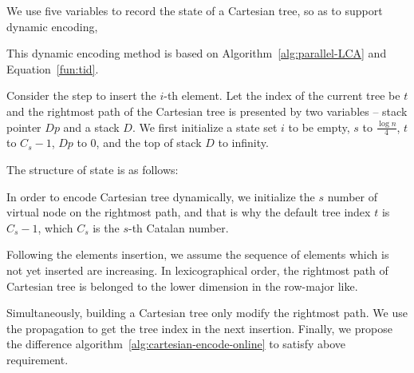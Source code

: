 



We use five variables to record the state of a Cartesian tree, so as
to support dynamic encoding,

This dynamic encoding method is based on
Algorithm~\ref{alg:parallel-LCA} and Equation~\ref{fun:tid}.

Consider the step to insert the $i$-th element.  Let the index of the
current tree be $t$ and the rightmost path of the Cartesian tree is
presented by two variables -- stack pointer $Dp$ and a stack $D$.  We
first initialize a state set $i$ to be empty, $s$ to $\frac{\log
  n}{4}$, ${t}$ to $C_s - 1$, $Dp$ to 0, and the top of stack $D$ to
infinity.

The structure of state is as follows:

\iffalse
我們定義轉移狀態由 5 個變數來決定動態笛卡爾樹的編碼，當前插入第 $i$ 個
元素，最終填充 $s$ 個元素，當前的樹編號 $\mathit{tid}$，以及笛卡爾樹的
右鏈狀態指針 $Dp$ 與其堆疊 $D$，其結構如下：
\fi


\begin{minipage}{0.9\linewidth}



\end{minipage}


In order to encode Cartesian tree dynamically, we initialize the $s$
number of virtual node on the rightmost path, and that is why the
default tree index ${\mathit t}$ is $C_s - 1$, which $C_s$ is the
$s$-th Catalan number.

Following the elements insertion, we assume the sequence of elements
which is not yet inserted are increasing.  In lexicographical order,
the rightmost path of Cartesian tree is belonged to the lower
dimension in the row-major like.

Simultaneously, building a Cartesian tree only modify the rightmost
path.  We use the propagation to get the tree index in the next
insertion.  Finally, we propose the difference
algorithm~\ref{alg:cartesian-encode-online} to satisfy above
requirement.

